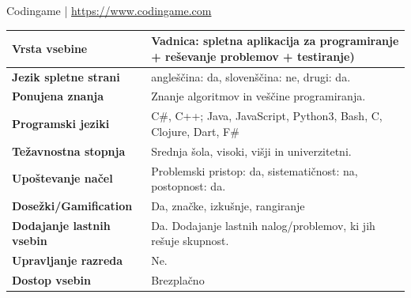 \begin{osebnabox}[label={osebna:codingame}]{Codingame |
    \url{https://www.codingame.com}}
    \begin{tabular}{
  p{} |
  p{}  }
  \textbf{Vrsta vsebine} & Vadnica: spletna aplikacija za
                           programiranje + reševanje problemov +
                           testiranje) \\
      \hline
  \textbf{Jezik spletne strani} & angleščina: da, slovenščina: ne,
                                  drugi: da. \\
      \hline
  \textbf{Ponujena znanja} & Znanje algoritmov in veščine programiranja. \\
      \hline
 \textbf{Programski jeziki} & C\#, C++; Java, JavaScript, Python3,
                              Bash, C, Clojure, Dart, F\# \\  
      \hline
  \textbf{Težavnostna stopnja} & Srednja šola, visoki, višji in
                                 univerzitetni. \\ 
      \hline
   \textbf{Upoštevanje načel} & Problemski pristop: da,
                                sistematičnost: na, postopnost: da. \\
      \hline
  \textbf{Dosežki/Gamification} & Da, značke, izkušnje, rangiranje \\
      \hline
  \textbf{Dodajanje lastnih vsebin} & Da. Dodajanje lastnih
                                      nalog/problemov, ki jih rešuje
                                      skupnost. \\
      \hline
  \textbf{Upravljanje razreda} & Ne. \\ 
      \hline
  \textbf{Dostop vsebin} & Brezplačno   \\  

\end{tabular}
\end{osebnabox}


